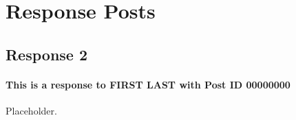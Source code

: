 
\section{Response Posts}
  \subsection{Response 2}
    \paragraph{This is a response to FIRST LAST with Post ID 00000000}
    Placeholder.
